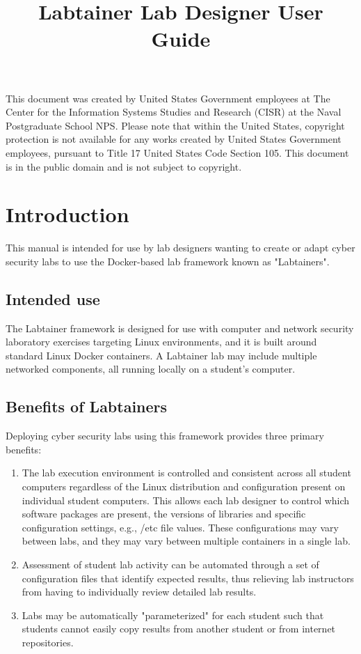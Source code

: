 \documentclass{article}
\begin{document}
\begin{titlepage}
\title {Labtainer Lab Designer User Guide}
\maketitle

\vspace{2.0in}
This document was created by United States Government employees at 
The Center for the Information Systems Studies and Research (CISR) at the Naval Postgraduate School NPS. 
Please note that within the United States, copyright protection is not available for any works created  
by United States Government employees, pursuant to Title 17 United States Code Section 105.   
This document is in the public domain and is not subject to copyright. 
\end{titlepage}
\tableofcontents
\newpage
\section {Introduction}
This manual is intended for use by lab designers wanting
to create or adapt cyber security labs to use the Docker-based lab framework known
as "Labtainers".

\subsection{Intended use}
The Labtainer framework is designed for use with computer and network security
laboratory exercises targeting Linux environments, and it is built around 
standard Linux Docker containers.  A Labtainer lab may include multiple 
networked components, all running locally on a student's computer.
\subsection {Benefits of Labtainers}

Deploying cyber security labs using this framework
provides three primary benefits:

\begin{enumerate}
\item The lab execution environment is controlled and consistent
across all student computers regardless of the Linux distribution
and configuration present on individual student computers.  
This allows each lab designer to control
which software packages are present, the versions of libraries and
specific configuration settings, e.g., /etc file values. These configurations
may vary between labs, and they may vary between multiple containers in
a single lab.

\item Assessment of student lab activity can be automated through a
set of configuration files that identify expected results, thus
relieving lab instructors from having to individually review detailed lab
results.

\item Labs may be automatically "parameterized" for each student such that
students cannot easily copy results from another student or from internet
repositories.  
\end{enumerate}
\end{document}
